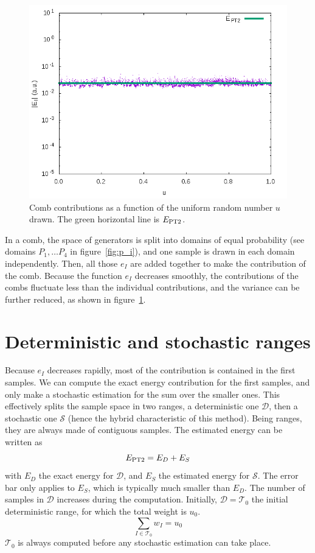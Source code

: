 \documentclass[./thesis.tex]{subfiles}
\begin{document}
\begin{figure}[h!]
	\begin{center}
		\includegraphics[width=0.7\columnwidth]{figures/pt2/comb_variance}
	\end{center}
		\caption{Comb contributions as a function of the uniform random number $u$ drawn. The green horizontal line is $E_\text{PT2}$.}
		\label{fig:ei_comb}
\end{figure}
In a comb, the space of generators is split into domains of equal probability (see
domains $P_1, \dots P_4$ in figure~\ref{fig:p_i}), and
one sample is drawn in each domain independently. Then, all those $e_I$ are added together to make the contribution of the comb. Because the function $e_I$ decreases smoothly, the contributions of the combs fluctuate less than the individual contributions, and the variance can be further reduced, as shown in figure~\ref{fig:ei_comb}.




\section{Deterministic and stochastic ranges}
Because $e_I$ decreases rapidly, most of the contribution is contained in the first samples. We can compute the exact energy contribution for the first samples, and only make a stochastic estimation for the sum over the smaller ones. This effectively splits the sample space in two ranges, a deterministic one $\mathcal{D}$, then a stochastic one $\mathcal{S}$ (hence the hybrid characteristic of this method). Being ranges, they are always made of contiguous samples. The estimated energy can be written as
\begin{equation}
E_\text{PT2} = E_D + E_S
\end{equation}
with $E_D$ the exact energy for $\mathcal{D}$, and $E_S$ the estimated energy for $\mathcal{S}$. The error bar only applies to $E_S$, which is typically much smaller than $E_D$.
The number of samples in $\mathcal{D}$ increases during the computation. Initially, $\mathcal{D}=\mathcal{T}_0$ the initial deterministic range, for which the total weight is $u_0$.
\begin{equation}
\sum_{I \in \mathcal{T}_0} w_I=u_0
\end{equation}
$\mathcal{T}_0$ is always computed before any stochastic estimation can take place.
\end{document}
